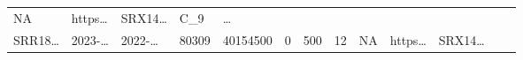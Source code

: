 \documentclass[
]{article}
\begin{document}
\begin{longtable}[]{@{}lllllllllllll@{}}
\begin{minipage}[t]{0.05\columnwidth}
NA\strut
\end{minipage} & \begin{minipage}[t]{0.05\columnwidth}\raggedright
https\ldots{}\strut
\end{minipage} & \begin{minipage}[t]{0.05\columnwidth}\raggedright
SRX14\ldots{}\strut
\end{minipage} & \begin{minipage}[t]{0.08\columnwidth}\raggedright
C\_9\strut
\end{minipage} & \begin{minipage}[t]{0.02\columnwidth}\raggedright
\ldots{}\strut
\end{minipage}\tabularnewline
\begin{minipage}[t]{0.05\columnwidth}\raggedright
SRR18\ldots{}\strut
\end{minipage} & \begin{minipage}[t]{0.05\columnwidth}\raggedright
2023-\ldots{}\strut
\end{minipage} & \begin{minipage}[t]{0.05\columnwidth}\raggedright
2022-\ldots{}\strut
\end{minipage} & \begin{minipage}[t]{0.04\columnwidth}\raggedright
80309\strut
\end{minipage} & \begin{minipage}[t]{0.05\columnwidth}\raggedright
40154500\strut
\end{minipage} & \begin{minipage}[t]{0.05\columnwidth}\raggedright
0\strut
\end{minipage} & \begin{minipage}[t]{0.05\columnwidth}\raggedright
500\strut
\end{minipage} & \begin{minipage}[t]{0.05\columnwidth}\raggedright
12\strut
\end{minipage} & \begin{minipage}[t]{0.05\columnwidth}\raggedright
NA\strut
\end{minipage} & \begin{minipage}[t]{0.05\columnwidth}\raggedright
https\ldots{}\strut
\end{minipage} & \begin{minipage}[t]{0.05\columnwidth}\raggedright
SRX14\ldots{}\strut
\end{minipage} & \begin{minipage}[t]{0.08\columnwidth}\raggedright

\end{minipage}
\end{longtable}
\end{document}
